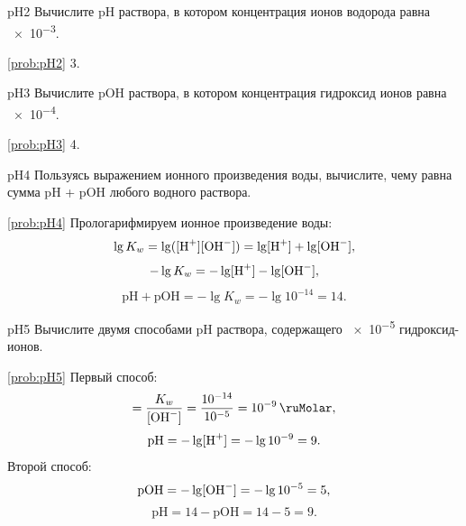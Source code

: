 \begin{problem}{}{pH2}
    Вычислите pH раствора, в котором концентрация ионов водорода равна \qty{e-3}{\ruMolar}.
    \begin{sol}{\ref{prob:pH2}}
        3.
    \end{sol}
\end{problem}

\begin{problem}{}{pH3}
    Вычислите pOH раствора, в котором концентрация гидроксид ионов равна \qty{e-4}{\ruMolar}.
    \begin{sol}{\ref{prob:pH3}}
        4.
    \end{sol}
\end{problem}

\begin{problem}{}{pH4}
    Пользуясь выражением ионного произведения воды, вычислите, чему равна сумма pH + pOH любого водного раствора.
    \begin{sol}{\ref{prob:pH4}}
        Прологарифмируем ионное произведение воды:
        \begin{equation*}
            \lg{K_w} = \lg([\ce{H^+}][\ce{OH^-}]) = \lg[\ce{H^+}] + \lg[\ce{OH^-}],
        \end{equation*}
        \begin{equation*}
            -\lg{K_w} = -\lg[\ce{H^+}] - \lg[\ce{OH^-}],
        \end{equation*}
        \begin{equation*}
            \text{pH} + \text{pOH} = -\lg{K_w} = -\lg 10^{-14} = 14.
        \end{equation*}
    \end{sol}
\end{problem}

\begin{problem}{}{pH5}
    Вычислите двумя способами pH раствора, содержащего \qty{e-5}{\ruMolar} гидроксид-ионов.
    \begin{sol}{\ref{prob:pH5}}
        Первый способ:
        \begin{equation*}
            [\ce{H^+}] = \frac{K_w}{[\ce{OH^-}]} = \frac{10^{-14}}{10^{-5}} = \qty{e-9}{\ruMolar},
        \end{equation*}
        \begin{equation*}
            \text{pH} = -\lg[\ce{H^+}] = -\lg{10^{-9}} = 9.
        \end{equation*}
        Второй способ:
        \begin{equation*}
            \text{pOH} = -\lg[\ce{OH^-}] = -\lg{10^{-5}} = 5,
        \end{equation*}
        \begin{equation*}
            \text{pH} = 14 - \text{pOH} = 14 - 5 = 9.
        \end{equation*}
    \end{sol}
\end{problem}


